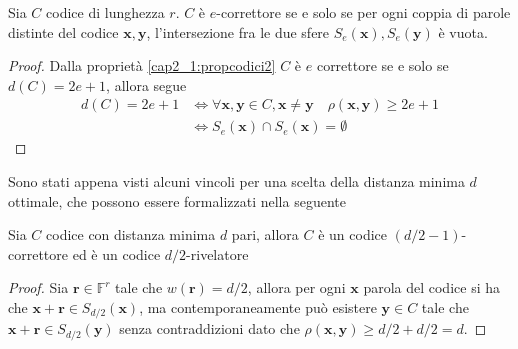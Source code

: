 \begin{prop}
   Sia $C$ codice di lunghezza $r$. $C$ è $e$-correttore se e solo se per ogni coppia di parole distinte del codice $\mathbf{x},\mathbf{y}$, l'intersezione fra le due sfere $S_{e}(\mathbf{x}),S_{e}(\mathbf{y})$ è vuota.
\end{prop}
\begin{proof}
   Dalla proprietà \ref{cap2_1:propcodici2} $C$ è $e$ correttore se e solo se $d(C)= 2e+1$, allora segue
   \begin{align*}
      d(C)= 2e+1 
      &\iff \forall \mathbf{x},\mathbf{y} \in C, \mathbf{x} \neq \mathbf{y} \quad \rho(\mathbf{x},\mathbf{y}) \geq 2e + 1 \\
      &\iff S_{e}(\mathbf{x}) \cap S_{e}(\mathbf{x}) = \emptyset
   \end{align*}
\end{proof}
\noindent
Sono stati appena visti alcuni vincoli per una scelta della distanza minima $d$ ottimale, che possono essere formalizzati nella seguente
\begin{prop}
   Sia $C$ codice con distanza minima $d$ pari, allora $C$ è un codice $(d/2-1)$-correttore ed è un codice $d/2$-rivelatore
\end{prop}
\begin{proof}
   Sia $\mathbf{r} \in \mathbb{F}^{r}$ tale che $w(\mathbf{r}) = d/2$, allora per ogni $\mathbf{x}$ parola del codice si ha che $\mathbf{x} + \mathbf{r} \in S_{d/2}(\mathbf{x})$, ma contemporaneamente può esistere $\mathbf{y} \in C$ tale che $\mathbf{x} + \mathbf{r} \in S_{d/2}(\mathbf{y})$ senza contraddizioni dato che $\rho(\mathbf{x}, \mathbf{y}) \geq d/2+d/2 = d$.
\end{proof}

